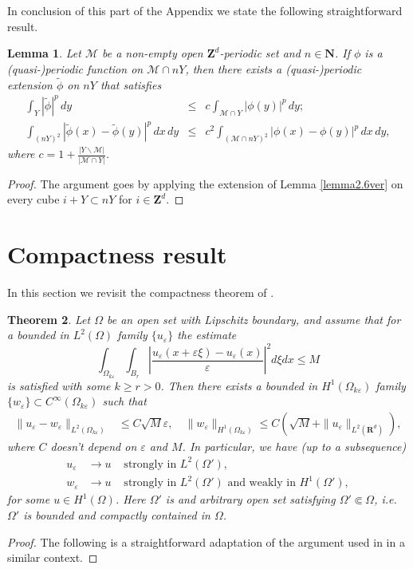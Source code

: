 \documentclass[11pt]{article}
\newcommand\e {\varepsilon}
\newcommand{\ext}[1]{\widetilde{#1}}
\def\RR{\R}
\newcommand{\R}{\mathbf{R}}
\newcommand\Z{\mathbf{Z}}
\newtheorem{theorem}{Theorem}[section]
\newtheorem{lemma}[theorem]{Lemma}
\theoremstyle{remark}
\begin{document}
\begin{appendices}
In conclusion of this part of the Appendix we state the following straightforward result.
\begin{lemma}\label{rA.7}
	Let $\mathcal{M}$ be a non-empty open $\Z^d$-periodic set and $n \in \mathbf{N}$. If $\phi$ is a (quasi-)periodic function on $ \mathcal{M} \cap nY$, then there exists a (quasi-)periodic extension $\tilde{\phi}$ on $nY$ that satisfies
	\begin{eqnarray*}
		\int_Y |\ext{\phi}|^p \,dy &\leq& c \int_{ \mathcal{M}\cap Y} 	|\phi(y)|^p \,dy; \\
		\int_{(nY)^2} |\ext{\phi}(x)-\ext{\phi} (y)|^p\,dx\,dy &\leq& c^2  \int_{(\mathcal{M}\cap nY)^2} |\phi(x)-\phi (y)|^p\,dx\,dy,
	\end{eqnarray*} 	
	where $c=1+\frac{|Y \backslash \mathcal{M}|}{|\mathcal{M} \cap Y|}$.
\end{lemma}
\begin{proof}
	The argument goes by applying the extension of Lemma \ref{lemma2.6ver} on every cube $i+Y \subset nY$ for $i \in \Z^d$.
\end{proof} 	
	 	

\section{Compactness result}\label{a2}

In this section we revisit the compactness theorem of \cite{BrP2021}.

\begin{theorem}\label{th compactness}
	Let $\Omega$ be an open set with Lipschitz boundary, and assume that for a bounded in $L^2(\Omega)$ family $\{u_\e\}$ the estimate
	\begin{equation}\label{1}
		\int_{\Omega_{k\e}} \int_{B_r} \left| \frac{u_\e(x+\e\xi) - u_\e(x)}\e \right|^2 d\xi dx \leq M
	\end{equation}
	is satisfied with some $k\geq r>0$. Then there exists a bounded in $H^1(\Omega_{k\e})$ family $\{w_\e\} \subset C^\infty(\Omega_{k\e})$ such that
	\begin{eqnarray}\label{3a}
		\|u_\e - w_\e\|_{L^2(\Omega_{k\e})}&\leq C\sqrt{M}\e,\quad \|w_\e \|_{H^1(\Omega_{k\e})} \leq C(\sqrt{M}+\|u_\e \|_{L^2(\RR^d)}),
	\end{eqnarray}
	where $C$ doesn't depend on $\e$ and $M$.
	In particular, we have (up to a subsequence)
	\begin{eqnarray*}
		u_\e &\to u& \mbox{ strongly in } L^2(\Omega'),
		\\
		w_\e &\to u& \mbox{ strongly in } L^2(\Omega') \mbox{ and weakly in } H^1(\Omega'),
	\end{eqnarray*}
	for some $u\in H^1(\Omega)$. Here $\Omega'$ is and arbitrary open set satisfying $\Omega'\Subset \Omega$, i.e. $\Omega'$ is bounded and compactly contained in $\Omega$.
\end{theorem}
\begin{proof}
	The following is a straightforward adaptation of the argument used in \cite[Theorem 2]{CC2015} in a similar context.
	

\end{proof}
\end{appendices}
\end{document}
